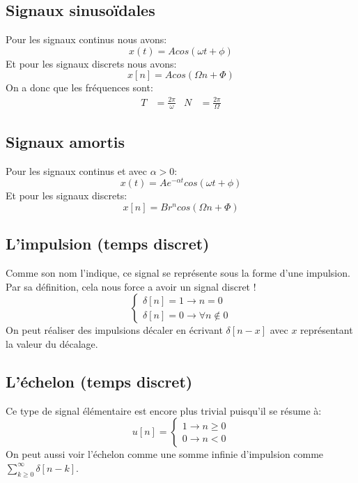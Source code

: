\documentclass{report}
\begin{document}
\subsection{Signaux sinusoïdales}
\noindent
Pour les signaux continus nous avons:
\begin{equation}
x(t) = A cos(\omega t + \phi)
\end{equation}
Et pour les signaux discrets nous avons:
\begin{equation}
x[n] = A cos(\Omega n + \Phi)
\end{equation}
On a donc que les fréquences sont:
\begin{align}
T &= \frac{2 \pi}{\omega} & N &= \frac{2 \pi}{\Omega}
\end{align}

\subsection{Signaux amortis}
\noindent
Pour les signaux continus et avec $\alpha > 0$:
\begin{equation}
x(t) = A e^{-\alpha t}cos(\omega t + \phi)
\end{equation}
Et pour les signaux discrets:
\begin{equation}
x[n] = Br^ncos(\Omega n + \Phi)
\end{equation}

\subsection{L'impulsion (temps discret)}
Comme son nom l'indique, ce signal se représente sous la forme d'une impulsion. Par sa définition, cela nous force a avoir un signal discret !
\begin{equation}
\begin{cases}
\delta [n] = 1 \rightarrow n = 0 \\
\delta [n] = 0 \rightarrow \forall n \notin 0
\end{cases}
\end{equation}
On peut réaliser des impulsions décaler en écrivant $\delta [n-x]$ avec $x$ représentant la valeur du décalage.

\subsection{L'échelon (temps discret)}
\noindent
Ce type de signal élémentaire est encore plus trivial puisqu'il se résume à:
\begin{equation}\label{eq:1}
u[n]=
\begin{cases}
1 \rightarrow n \geq 0 \\
0 \rightarrow n < 0
\end{cases}
\end{equation}
On peut aussi voir l'échelon comme une somme infinie d'impulsion comme $\sum_{k \geq 0}^{\infty} \delta[n-k]$.
\end{document}
